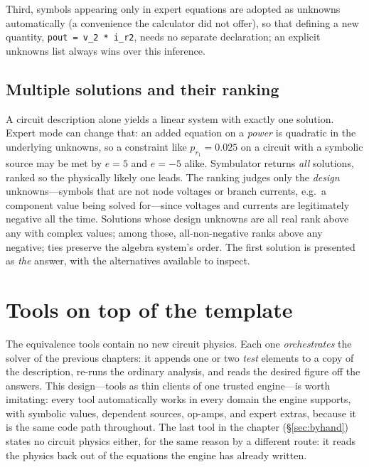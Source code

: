 \documentclass[11pt,oneside]{report}
\newcommand{\code}[1]{\texttt{#1}}
\begin{document}
Third, symbols appearing only in expert equations are adopted as
unknowns automatically (a convenience the calculator did not offer),
so that defining a new quantity, \code{pout = v\_2 * i\_r2}, needs no
separate declaration; an explicit unknowns list always wins over this
inference.

\section{Multiple solutions and their ranking}
\label{sec:multiple}

A circuit description alone yields a linear system with exactly one
solution. Expert mode can change that: an added equation on a
\emph{power} is quadratic in the underlying unknowns, so a constraint
like $p_{r_1} = 0.025$ on a circuit with a symbolic source may be met
by $e = 5$ and $e = -5$ alike. Symbulator returns \emph{all}
solutions, ranked so the physically likely one leads. The ranking
judges only the \emph{design} unknowns---symbols that are not node
voltages or branch currents, e.g.\ a component value being solved
for---since voltages and currents are legitimately negative all the
time. Solutions whose design unknowns are all real rank above any with
complex values; among those, all-non-negative ranks above any
negative; ties preserve the algebra system's order. The first solution
is presented as \emph{the} answer, with the alternatives available to
inspect.

\chapter{Tools on top of the template}
\label{ch:tools}

The equivalence tools contain no new circuit physics. Each one
\emph{orchestrates} the solver of the previous chapters: it appends
one or two \emph{test} elements to a copy of the description, re-runs
the ordinary analysis, and reads the desired figure off the answers.
This design---tools as thin clients of one trusted engine---is worth
imitating: every tool automatically works in every domain the engine
supports, with symbolic values, dependent sources, op-amps, and expert
extras, because it is the same code path throughout. The last tool in
the chapter (\S\ref{sec:byhand}) states no circuit physics either, for
the same reason by a different route: it reads the physics back out of
the equations the engine has already written.
\end{document}
